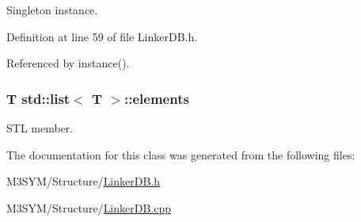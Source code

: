 Singleton instance. 



Definition at line 59 of file Linker\+D\+B.\+h.



Referenced by instance().

\hypertarget{classstd_1_1list_a682e5c7c91eb377d0cb4f019b2b81a5d}{
\subsubsection[{elements}]{\setlength{\rightskip}{0pt plus 5cm}T std\+::list$<$ T $>$\+::elements\hspace{0.3cm}{\ttfamily [inherited]}}}\label{classstd_1_1list_a682e5c7c91eb377d0cb4f019b2b81a5d}


S\+T\+L member. 



The documentation for this class was generated from the following files\+:\begin{DoxyCompactItemize}
\item 
M3\+S\+Y\+M/\+Structure/\hyperlink{LinkerDB_8h}{Linker\+D\+B.\+h}\item 
M3\+S\+Y\+M/\+Structure/\hyperlink{LinkerDB_8cpp}{Linker\+D\+B.\+cpp}\end{DoxyCompactItemize}

